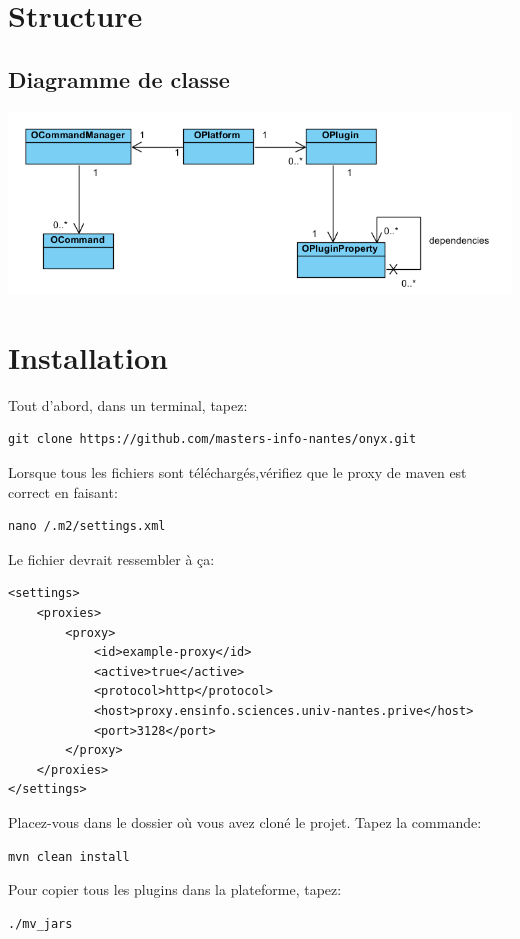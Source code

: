 \section{Structure}

\subsection{Diagramme de classe}
\includegraphics[width=15cm]{figures/class_diagram.png}
\newpage
\section{Installation}

Tout d’abord, dans un terminal, tapez:
\begin{verbatim}
git clone https://github.com/masters-info-nantes/onyx.git
\end{verbatim}

Lorsque tous les fichiers sont téléchargés,vérifiez que le proxy de maven est correct en faisant:
\begin{verbatim}
nano /.m2/settings.xml
\end{verbatim}

Le fichier devrait ressembler à ça:
\begin{verbatim}
<settings>
    <proxies>
        <proxy>
            <id>example-proxy</id>
            <active>true</active>
            <protocol>http</protocol>
            <host>proxy.ensinfo.sciences.univ-nantes.prive</host>
            <port>3128</port>
        </proxy>
    </proxies>
</settings>
\end{verbatim}

Placez-vous dans le dossier où vous avez cloné le projet. 
Tapez la commande:
\begin{verbatim}
mvn clean install
\end{verbatim}

Pour copier tous les plugins dans la plateforme, tapez:
\begin{verbatim}
./mv_jars
\end{verbatim}

